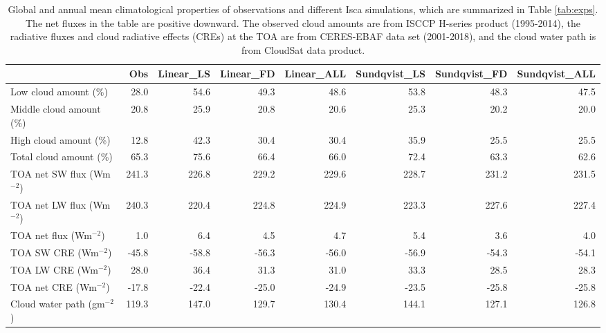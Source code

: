 \begin{sidewaystable}
	\caption{Global and annual mean climatological properties of observations and different Isca simulations, which are summarized in Table \ref{tab:exps}. The net fluxes in the table are positive downward. The observed cloud amounts are from ISCCP H-series product (1995-2014), the radiative fluxes and cloud radiative effects (CREs) at the TOA are from CERES-EBAF data set (2001-2018), and the cloud water path is from CloudSat data product.}
	\vspace{0.5em}
	\centering
	\renewcommand{\arraystretch}{1.5}
	\begin{tabular}{lrrrrrrr}
    	\hline
    	{} &   Obs &  Linear\_LS &  Linear\_FD &  Linear\_ALL &  Sundqvist\_LS &  Sundqvist\_FD &  Sundqvist\_ALL \\
    	\hline
    	Low cloud amount (\%)      &  28.0 &       54.6 &       49.3 &        48.6 &          53.8 &          48.3 &           47.5 \\
    	Middle cloud amount (\%)   &  20.8 &       25.9 &       20.8 &        20.6 &          25.3 &          20.2 &           20.0 \\
    	High cloud amount (\%)     &  12.8 &       42.3 &       30.4 &        30.4 &          35.9 &          25.5 &           25.5 \\
    	Total cloud amount (\%)    &  65.3 &       75.6 &       66.4 &        66.0 &          72.4 &          63.3 &           62.6 \\
    	TOA net SW flux (Wm$^{-2}$)  & 241.3 &      226.8 &      229.2 &       229.6 &         228.7 &         231.2 &          231.5 \\
    	TOA net LW flux (Wm$^{-2}$)  & 240.3 &      220.4 &      224.8 &       224.9 &         223.3 &         227.6 &          227.4 \\
    	TOA net flux (Wm$^{-2}$)     &   1.0 &        6.4 &        4.5 &         4.7 &           5.4 &           3.6 &            4.0 \\
    	TOA SW CRE (Wm$^{-2}$)       & -45.8 &      -58.8 &      -56.3 &       -56.0 &         -56.9 &         -54.3 &          -54.1 \\
    	TOA LW CRE (Wm$^{-2}$)       &  28.0 &       36.4 &       31.3 &        31.0 &          33.3 &          28.5 &           28.3 \\
    	TOA net CRE (Wm$^{-2}$)      & -17.8 &      -22.4 &      -25.0 &       -24.9 &         -23.5 &         -25.8 &          -25.8 \\
    	Cloud water path (gm$^{-2}$) & 119.3 &      147.0 &      129.7 &       130.4 &         144.1 &         127.1 &          126.8 \\
    	\hline
    \end{tabular}
    \label{tab:global_mean_climate}
\end{sidewaystable}


